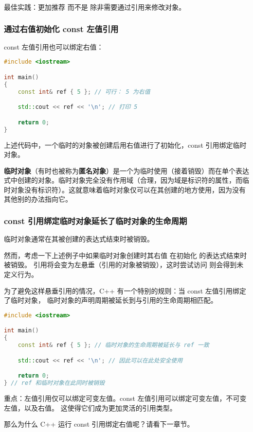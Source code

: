 \documentclass[../../LearnCpp.tex]{subfiles}
\begin{document}
最佳实践：更加推荐  而不是  除非需要通过引用来修改对象。

\subsubsection*{通过右值初始化 const 左值引用}

const 左值引用也可以绑定右值：

\begin{lstlisting}[language=C++]
#include <iostream>

int main()
{
    const int& ref { 5 }; // 可行： 5 为右值

    std::cout << ref << '\n'; // 打印 5

    return 0;
}
\end{lstlisting}

上述代码中，一个临时的对象被创建后用右值进行了初始化，const 引用绑定临时对象。

\textbf{临时对象}（有时也被称为\textbf{匿名对象}）是一个为临时使用（接着销毁）而在单个表达式中创建的对象。临时对象完全没有作用域（合理，因为域是标识符的属性，而临时对象没有标识符）。这就意味着临时对象仅可以在其创建的地方使用，因为没有其他别的办法指向它。

\subsubsection*{const 引用绑定临时对象延长了临时对象的生命周期}

临时对象通常在其被创建的表达式结束时被销毁。

然而，考虑一下上述例子中如果临时对象创建时其右值  在初始化  的表达式结束时被销毁。
 引用将会变为左悬垂（引用的对象被销毁），这时尝试访问  则会得到未定义行为。

为了避免这样悬垂引用的情况，C++ 有一个特别的规则：当 const 左值引用绑定了临时对象，
临时对象的声明周期被延长到与引用的生命周期相匹配。

\begin{lstlisting}[language=C++]
#include <iostream>

int main()
{
    const int& ref { 5 }; // 临时对象的生命周期被延长与 ref 一致

    std::cout << ref << '\n'; // 因此可以在此处安全使用

    return 0;
} // ref 和临时对象在此同时被销毁
\end{lstlisting}

重点：左值引用仅可以绑定可变左值。const 左值引用可以绑定可变左值，不可变左值，以及右值。
这使得它们成为更加灵活的引用类型。

那么为什么 C++ 运行 const 引用绑定右值呢？请看下一章节。
\end{document}
